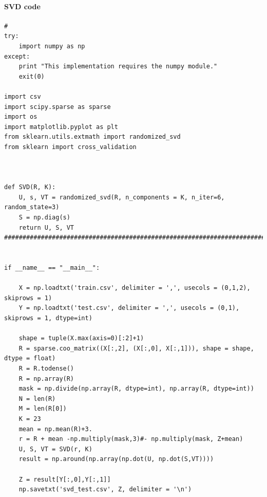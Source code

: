 \documentclass{article}
\begin{document}
\paragraph{SVD code}
\begin{verbatim}
#
try:
    import numpy as np
except:
    print "This implementation requires the numpy module."
    exit(0)

import csv
import scipy.sparse as sparse
import os
import matplotlib.pyplot as plt
from sklearn.utils.extmath import randomized_svd
from sklearn import cross_validation



def SVD(R, K):
    U, s, VT = randomized_svd(R, n_components = K, n_iter=6, random_state=3)	
    S = np.diag(s)
    return U, S, VT
##############################################################################


if __name__ == "__main__":

    X = np.loadtxt('train.csv', delimiter = ',', usecols = (0,1,2), skiprows = 1)
    Y = np.loadtxt('test.csv', delimiter = ',', usecols = (0,1), skiprows = 1, dtype=int)

    shape = tuple(X.max(axis=0)[:2]+1)
    R = sparse.coo_matrix((X[:,2], (X[:,0], X[:,1])), shape = shape, dtype = float)
    R = R.todense()
    R = np.array(R)
    mask = np.divide(np.array(R, dtype=int), np.array(R, dtype=int))
    N = len(R)
    M = len(R[0])
    K = 23
    mean = np.mean(R)+3.
    r = R + mean -np.multiply(mask,3)#- np.multiply(mask, Z+mean)
    U, S, VT = SVD(r, K)
    result = np.around(np.array(np.dot(U, np.dot(S,VT))))

    Z = result[Y[:,0],Y[:,1]]
    np.savetxt('svd_test.csv', Z, delimiter = '\n')

\end{verbatim}
\end{document}
